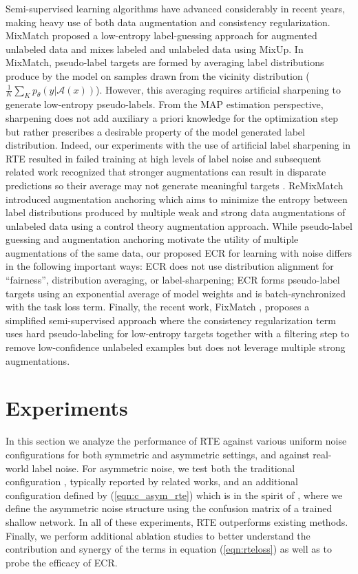 \documentclass{article}
\begin{document}
Semi-supervised learning algorithms have advanced considerably in recent years, making heavy use of both data augmentation and consistency regularization.  MixMatch \cite{48557} proposed a low-entropy label-guessing approach for augmented unlabeled data and mixes labeled and unlabeled data using MixUp.  In MixMatch, pseudo-label targets are formed by averaging label distributions produce by the model on samples drawn from the vicinity distribution ($\frac{1}{K}\sum_{K}p_{\theta}(y\vert \mathcal{A}(x))$).  However, this averaging requires artificial sharpening to generate low-entropy pseudo-labels.  From the MAP estimation perspective, sharpening does not add auxiliary a priori knowledge for the optimization step but rather prescribes a desirable property of the model generated label distribution.  Indeed, our experiments with the use of artificial label sharpening in RTE resulted in failed training at high levels of label noise and subsequent related work recognized that stronger augmentations can result in disparate predictions so their average may not generate meaningful targets \cite{Berthelot2020ReMixMatch:}.  ReMixMatch \cite{Berthelot2020ReMixMatch:} introduced augmentation anchoring which aims to minimize the entropy between label distributions produced by multiple weak and strong data augmentations of unlabeled data using a control theory augmentation approach.  While pseudo-label guessing and augmentation anchoring motivate the utility of multiple augmentations of the same data, our proposed ECR for learning with noise differs in the following important ways: ECR does not use distribution alignment for ``fairness'', distribution averaging, or label-sharpening; ECR forms pseudo-label targets using an exponential average of model weights and is batch-synchronized with the task loss term.  Finally, the recent work, FixMatch \cite{49534}, proposes a simplified semi-supervised approach where the consistency regularization term uses hard pseudo-labeling for low-entropy targets together with a filtering step to remove low-confidence unlabeled examples but does not leverage multiple strong augmentations.



\section{Experiments}
\label{sec:expt}
In this section we analyze the performance of RTE against various uniform noise configurations for both symmetric and asymmetric settings, and against real-world label noise.  For asymmetric noise, we test both the traditional configuration \cite{patrini2016}, typically reported by related works, and an additional configuration defined by (\ref{eqn:c_asym_rte}) which is in the spirit of \cite{lee2019}, where we define the asymmetric noise structure using the confusion matrix of a trained shallow network.  In all of these experiments, RTE outperforms existing methods.  Finally, we perform additional ablation studies to better understand the contribution and synergy of the terms in equation (\ref{eqn:rteloss}) as well as to probe the efficacy of ECR.
\end{document}
